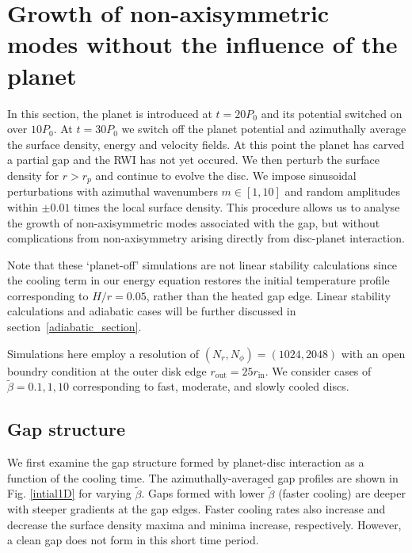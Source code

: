 \section{Growth of non-axisymmetric modes without the influence of the
  planet}\label{linear1}
In this section, the planet is introduced at $t=20P_0$ and 
its potential switched on over $10P_0$. At $t=30P_0$ we switch off the
planet potential and azimuthally average the surface density, energy
and velocity fields. At this point the planet has carved a partial
gap and the RWI has not yet occured.
 We then perturb the surface density for $r>r_p$ and continue to 
evolve the disc. We impose  sinusoidal perturbations with 
azimuthal wavenumbers $m\in[1,10]$ and random amplitudes within $\pm 0.01$
 times the local surface density.%
This procedure allows us to analyse the growth of 
non-axisymmetric modes associated with the gap, but without
complications from non-axisymmetry arising directly from disc-planet
interaction.

Note that these `planet-off' simulations are not linear stability
calculations since the cooling term in our energy equation
restores the initial temperature profile corresponding to $H/r=0.05$,
rather than the heated gap edge. Linear stability calculations and
adiabatic cases will be further discussed in
section~\ref{adiabatic_section}.  


Simulations here employ a resolution of $(N_r,N_{\phi})=(1024,2048)$
with an open boundry condition at the outer disk edge $r_\mathrm{out}=25r_\mathrm{in}$. We consider 
cases of $\tilde{\beta}=0.1,1,10$ corresponding to fast, moderate,
and slowly cooled discs. %

\subsection{Gap structure}
We first examine the gap structure formed by planet-disc
interaction as a function of the cooling time. The azimuthally-averaged 
gap profiles are shown in Fig. \ref{intial1D} for varying
$\tilde\beta$. Gaps formed with lower $\tilde\beta$ (faster cooling)
are deeper with steeper gradients at the gap edges. Faster cooling rates also 
increase and decrease the surface density maxima and 
minima increase, respectively. However, a clean gap does not form
in this short time period. 

